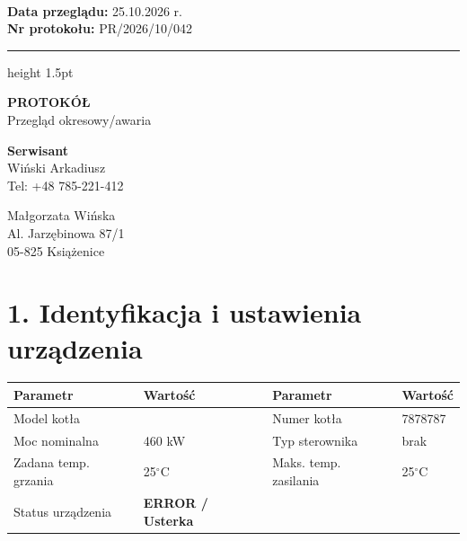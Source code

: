 \documentclass[10pt, a4paper]{article}
\begin{document}
\noindent
\begin{minipage}[c]{0.5\textwidth}
    ~
\end{minipage}
\hfill
\begin{minipage}[c]{0.48\textwidth}
    \raggedleft
    \textbf{Data przeglądu:} 25.10.2026 r.\\
    \textbf{Nr protokołu:} PR/2026/10/042
\end{minipage}

\vspace{0.4cm}
\hrule height 1.5pt
\vspace{0.5cm}

\begin{center}
    {\LARGE \textbf{PROTOKÓŁ}}\\[0.15cm]
    {\normalsize Przegląd okresowy/awaria}
\end{center}

\vspace{0.4cm}

\noindent
\begin{minipage}[t]{0.48\textwidth}
    \textbf{Serwisant}\\
    Wiński Arkadiusz\\
    Tel: +48 785-221-412\\
    
\end{minipage}
\hfill
\begin{minipage}[t]{0.48\textwidth}
    Małgorzata Wińska\\
    Al. Jarzębinowa 87/1\\
    05-825 Książenice
\end{minipage}

\vspace{0.6cm}

\section*{1. Identyfikacja i ustawienia urządzenia}
\noindent
\begin{tabularx}{\textwidth}{X l X l}
\toprule
\textbf{Parametr} & \textbf{Wartość} & \textbf{Parametr} & \textbf{Wartość} \\
\midrule
Model kotła & \dotfill & Numer kotła & 7878787 \\
Moc nominalna & 460 kW & Typ sterownika & brak \\
Zadana temp. grzania & 25$^\circ$C & Maks. temp. zasilania & 25$^\circ$C \\
Status urządzenia & \textbf{\textcolor{StatusErr}{ERROR / Usterka}} & & \\
\bottomrule
\end{tabularx}
\end{document}
